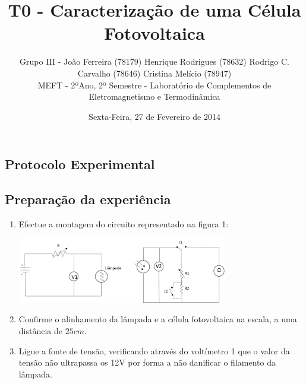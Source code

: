 \documentclass[10pt]{extarticle}
\begin{document}
\title {\bf \huge T0 - Caracterização de uma Célula Fotovoltaica}
\author
{{\small Grupo III - João Ferreira (78179) Henrique Rodrigues (78632) Rodrigo C. Carvalho (78646) Cristina Melício (78947)} \\
{\small MEFT - 2ºAno, 2º Semestre - Laboratório de Complementos de Eletromagnetismo e Termodinâmica}}
\date{{\small Sexta-Feira, 27 de Fevereiro de 2014}}
\maketitle

\begin{multicols}{2}

\section{Protocolo Experimental}

\subsection{Preparação da experiência}

\begin{enumerate}
\item Efectue a montagem do circuito representado na figura 1:

\hspace{-1.6cm}
\includegraphics[width=260pt]{circuito}

\begin{center}
\par{}
\end{center}

\item Confirme o alinhamento da lâmpada e a célula fotovoltaica na escala, a uma distância de $25cm$.

\item Ligue a fonte de tensão, verificando através do voltímetro 1 que o valor da tensão não ultrapassa os 12V por forma a não danificar o filamento da lâmpada. 

\end{enumerate}


\end{multicols}
\end{document}
